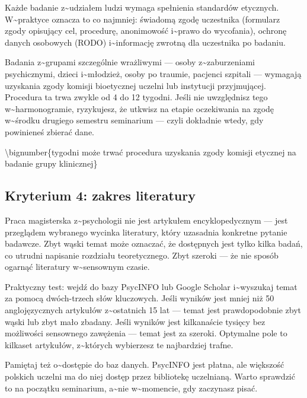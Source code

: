 \documentclass[12pt,a4paper,twoside,openany]{book}
\begin{document}
Każde badanie z\textasciitilde{}udziałem ludzi wymaga spełnienia standardów etycznych. W\textasciitilde{}praktyce oznacza to co najmniej: świadomą zgodę uczestnika (formularz zgody opisujący cel, procedurę, anonimowość i\textasciitilde{}prawo do wycofania), ochronę danych osobowych (RODO) i\textasciitilde{}informację zwrotną dla uczestnika po badaniu.


Badania z\textasciitilde{}grupami szczególnie wrażliwymi --- osoby z\textasciitilde{}zaburzeniami psychicznymi, dzieci i\textasciitilde{}młodzież, osoby po traumie, pacjenci szpitali --- wymagają uzyskania zgody komisji bioetycznej uczelni lub instytucji przyjmującej. Procedura ta trwa zwykle od 4 do 12 tygodni. Jeśli nie uwzględnisz tego w\textasciitilde{}harmonogramie, ryzykujesz, że utkwisz na etapie oczekiwania na zgodę w\textasciitilde{}środku drugiego semestru seminarium --- czyli dokładnie wtedy, gdy powinieneś zbierać dane.


\textbackslash{}bignumber\{tygodni może trwać procedura uzyskania zgody komisji etycznej na badanie grupy klinicznej\}


\subsection{Kryterium 4: zakres literatury}


Praca magisterska z\textasciitilde{}psychologii nie jest artykułem encyklopedycznym --- jest przeglądem wybranego wycinka literatury, który uzasadnia konkretne pytanie badawcze. Zbyt wąski temat może oznaczać, że dostępnych jest tylko kilka badań, co utrudni napisanie rozdziału teoretycznego. Zbyt szeroki --- że nie sposób ogarnąć literatury w\textasciitilde{}sensownym czasie.


Praktyczny test: wejdź do bazy PsycINFO lub Google Scholar i\textasciitilde{}wyszukaj temat za pomocą dwóch-trzech słów kluczowych. Jeśli wyników jest mniej niż 50 anglojęzycznych artykułów z\textasciitilde{}ostatnich 15 lat --- temat jest prawdopodobnie zbyt wąski lub zbyt mało zbadany. Jeśli wyników jest kilkanaście tysięcy bez możliwości sensownego zawężenia --- temat jest za szeroki. Optymalne pole to kilkaset artykułów, z\textasciitilde{}których wybierzesz te najbardziej trafne.


Pamiętaj też o\textasciitilde{}dostępie do baz danych. PsycINFO jest płatna, ale większość polskich uczelni ma do niej dostęp przez bibliotekę uczelnianą. Warto sprawdzić to na początku seminarium, a\textasciitilde{}nie w\textasciitilde{}momencie, gdy zaczynasz pisać.
\end{document}
